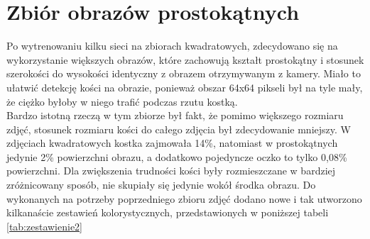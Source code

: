 \section{Zbiór obrazów prostokątnych}
Po wytrenowaniu kilku sieci na zbiorach kwadratowych, zdecydowano się na wykorzystanie
większych obrazów, które zachowują kształt prostokątny i stosunek szerokości do wysokości
identyczny z obrazem otrzymywanym z kamery. Miało to ułatwić detekcję kości na obrazie,
ponieważ obszar 64x64 pikseli był na tyle mały, że ciężko byłoby w niego trafić podczas
rzutu kostką.\\
Bardzo istotną rzeczą w tym zbiorze był fakt, że pomimo większego rozmiaru zdjęć, stosunek
rozmiaru kości do całego zdjęcia był zdecydowanie mniejszy. W zdjęciach kwadratowych kostka
zajmowała 14\%, natomiast w prostokątnych jedynie 2\% powierzchni obrazu, a dodatkowo pojedyncze
oczko to tylko 0,08\% powierzchni.
Dla zwiększenia trudności kości były rozmieszczane w bardziej zróżnicowany sposób, nie skupiały
się jedynie wokół środka obrazu. Do wykonanych na potrzeby poprzedniego zbioru zdjęć dodano
nowe i tak utworzono kilkanaście zestawień kolorystycznych, przedstawionych w poniższej tabeli \ref{tab:zestawienie2} \newpage

